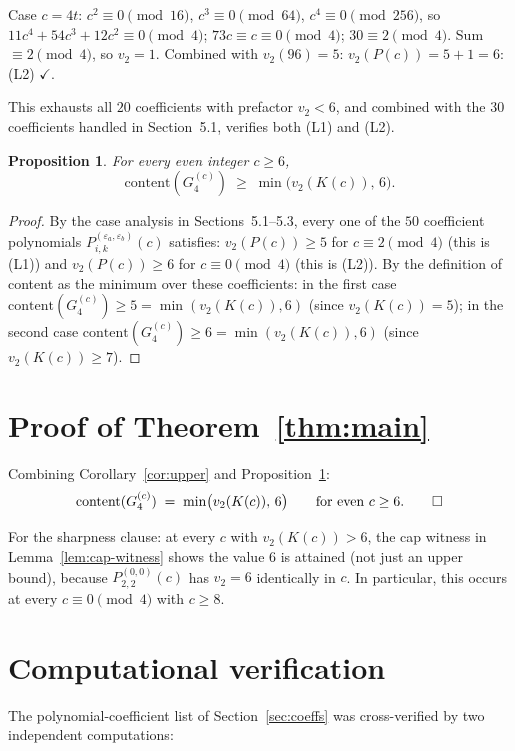\documentclass[11pt]{article}
\newtheorem{proposition}[theorem]{Proposition}
\begin{document}
Case $c = 4t$: $c^2 \equiv 0 \pmod{16}$, $c^3 \equiv 0 \pmod {64}$, $c^4 \equiv 0 \pmod{256}$, so
$11 c^4 + 54 c^3 + 12 c^2 \equiv 0 \pmod 4$; $73 c \equiv c \equiv 0 \pmod 4$; $30 \equiv 2 \pmod 4$.
Sum $\equiv 2 \pmod 4$, so $v_2 = 1$. Combined with $v_2(96) = 5$: $v_2(P(c)) = 5 + 1 = 6$: (L2) $\checkmark$.

\medskip
This exhausts all $20$ coefficients with prefactor $v_2 < 6$, and combined with the $30$
coefficients handled in Section~5.1, verifies both (L1) and (L2).

\begin{proposition}\label{prop:lower}
For every even integer $c \ge 6$,
\[
  \mathrm{content}(G_4^{(c)}) \;\ge\; \min\bigl(v_2(K(c)),\, 6\bigr).
\]
\end{proposition}

\begin{proof}
By the case analysis in Sections~5.1--5.3, every one of the $50$ coefficient polynomials
$P^{(\varepsilon_a, \varepsilon_b)}_{i,k}(c)$ satisfies:
$v_2(P(c)) \ge 5$ for $c \equiv 2 \pmod 4$ (this is (L1))
and $v_2(P(c)) \ge 6$ for $c \equiv 0 \pmod 4$ (this is (L2)).
By the definition of content as the minimum over these coefficients:
in the first case $\mathrm{content}(G_4^{(c)}) \ge 5 = \min(v_2(K(c)), 6)$ (since $v_2(K(c)) = 5$);
in the second case $\mathrm{content}(G_4^{(c)}) \ge 6 = \min(v_2(K(c)), 6)$ (since $v_2(K(c)) \ge 7$).
\end{proof}

\section{Proof of Theorem~\ref{thm:main}}

Combining Corollary~\ref{cor:upper} and Proposition~\ref{prop:lower}:
\[
  \mathrm{content}(G_4^{(c)}) \;=\; \min\bigl(v_2(K(c)),\, 6\bigr) \qquad \text{for even } c \ge 6. \qed
\]

For the sharpness clause: at every $c$ with $v_2(K(c)) > 6$, the cap witness in
Lemma~\ref{lem:cap-witness} shows the value $6$ is attained (not just an upper bound),
because $P^{(0,0)}_{2,2}(c)$ has $v_2 = 6$ identically in $c$. In particular, this
occurs at every $c \equiv 0 \pmod 4$ with $c \ge 8$.

\section{Computational verification}\label{sec:verify}

The polynomial-coefficient list of Section~\ref{sec:coeffs} was cross-verified by two
independent computations:
\end{document}

